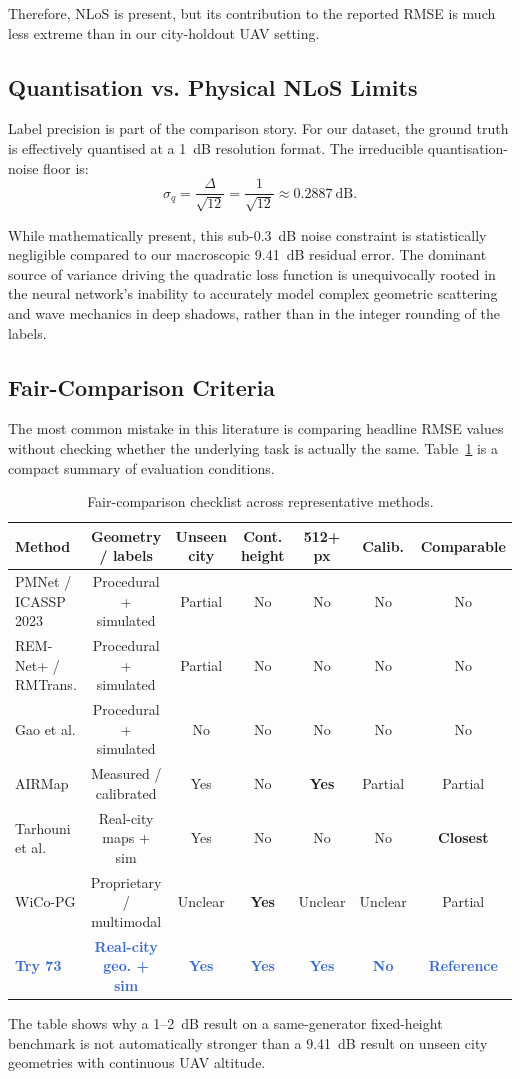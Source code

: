 \documentclass[11pt,a4paper]{article}
\newcommand{\better}[1]{\textcolor{good}{\textbf{#1}}}
\newcommand{\ours}[1]{\textcolor{highlight}{\textbf{#1}}}
\begin{document}
Therefore, NLoS is present, but its contribution to the reported RMSE is
much less extreme than in our city-holdout UAV setting.

\subsection{Quantisation vs. Physical NLoS Limits}

Label precision is part of the comparison story. For our dataset, the ground truth is effectively quantised at a 1~dB resolution format. The irreducible quantisation-noise floor is:
\[
    \sigma_q = \frac{\Delta}{\sqrt{12}} = \frac{1}{\sqrt{12}} \approx 0.2887~\mathrm{dB}.
\]

While mathematically present, this sub-0.3~dB noise constraint is statistically negligible compared to our macroscopic 9.41~dB residual error. The dominant source of variance driving the quadratic loss function is unequivocally rooted in the neural network's inability to accurately model complex geometric scattering and wave mechanics in deep shadows, rather than in the integer rounding of the labels.

\subsection{Fair-Comparison Criteria}

The most common mistake in this literature is comparing headline RMSE values
without checking whether the underlying task is actually the same. Table~\ref{tab:fairness} is a compact summary of evaluation conditions.

\begin{table}[h!]
\centering
\caption{Fair-comparison checklist across representative methods.}
\label{tab:fairness}
\footnotesize
\begin{tabularx}{\textwidth}{Xcccccc}
\toprule
\textbf{Method} & \textbf{Geometry / labels} & \textbf{Unseen city} & \textbf{Cont. height}
& \textbf{512+ px} & \textbf{Calib.} & \textbf{Comparable} \\
\midrule
PMNet / ICASSP 2023 & Procedural + simulated & Partial & No & No & No & No \\
REM-Net+ / RMTrans. & Procedural + simulated & Partial & No & No & No & No \\
Gao et al. & Procedural + simulated & No & No & No & No & No \\
AIRMap & Measured / calibrated & Yes & No & \better{Yes} & Partial & Partial \\
Tarhouni et al. & Real-city maps + sim & Yes & No & No & No & \better{Closest} \\
WiCo-PG & Proprietary / multimodal & Unclear & \better{Yes} & Unclear & Unclear & Partial \\
\ours{Try 73} & \ours{Real-city geo. + sim} & \ours{Yes} & \ours{Yes} & \ours{Yes} & \ours{No} & \ours{Reference} \\
\bottomrule
\end{tabularx}
\end{table}
\normalsize
The table shows why a 1--2~dB result on a same-generator fixed-height benchmark
is not automatically stronger than a 9.41~dB result on unseen city geometries with
continuous UAV altitude. 
\end{document}
